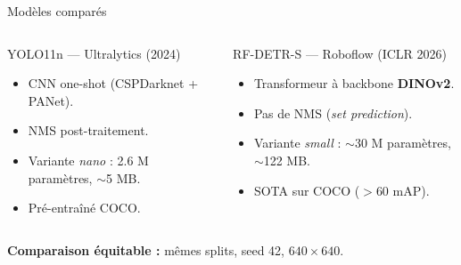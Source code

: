 \documentclass[11pt,aspectratio=169]{beamer}
\begin{document}
\begin{frame}{Modèles comparés}
  \begin{columns}[T,onlytextwidth]
    \begin{block}{YOLO11n — Ultralytics (2024)}
      \begin{itemize}
        \item CNN one-shot (CSPDarknet + PANet).
        \item NMS post-traitement.
        \item Variante \emph{nano} : 2.6 M paramètres, $\sim$5 MB.
        \item Pré-entraîné COCO.
      \end{itemize}
    \end{block}

    \begin{block}{RF-DETR-S — Roboflow (ICLR 2026)}
      \begin{itemize}
        \item Transformeur à backbone \textbf{DINOv2}.
        \item Pas de NMS (\emph{set prediction}).
        \item Variante \emph{small} : $\sim$30 M paramètres, $\sim$122 MB.
        \item SOTA sur COCO ($>$60 mAP).
      \end{itemize}
    \end{block}
  \end{columns}
  \medskip
  \centering\textbf{Comparaison équitable :} mêmes splits, seed 42, $640\times 640$.
\end{frame}
\end{document}
